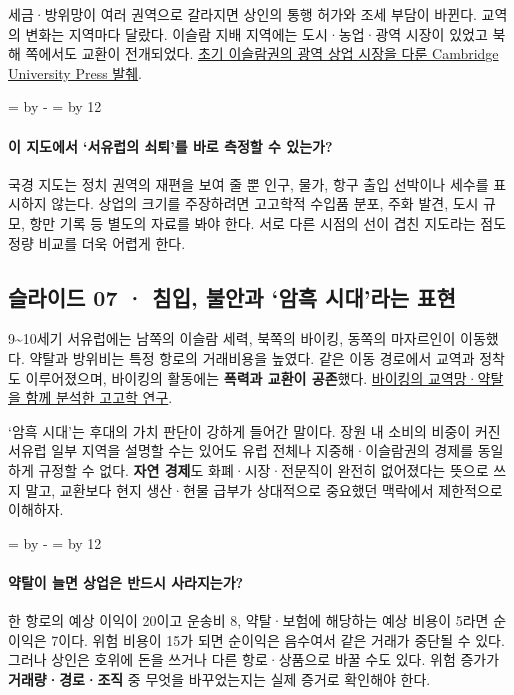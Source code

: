 \documentclass[10pt,a4paper]{article}
\newcommand{\ReserveQuestionSpace}{%
  \par\begingroup
  \dimen0=\pagegoal \advance\dimen0 by -\pagetotal
  \dimen2=\baselineskip \multiply\dimen2 by 12
  \ifdim\dimen0<\dimen2 \newpage\fi
  \endgroup}
\begin{document}
세금·방위망이 여러 권역으로 갈라지면 상인의 통행 허가와 조세 부담이 바뀐다. 교역의 변화는 지역마다 달랐다. 이슬람 지배 지역에는 도시·농업·광역 시장이 있었고 북해 쪽에서도 교환이 전개되었다. \href{https://assets.cambridge.org/97811071/56388/excerpt/9781107156388\_excerpt.pdf}{초기 이슬람권의 광역 상업 시장을 다룬 Cambridge University Press 발췌}.\par

\ReserveQuestionSpace
\paragraph{이 지도에서 ‘서유럽의 쇠퇴’를 바로 측정할 수 있는가?}
국경 지도는 정치 권역의 재편을 보여 줄 뿐 인구, 물가, 항구 출입 선박이나 세수를 표시하지 않는다. 상업의 크기를 주장하려면 고고학적 수입품 분포, 주화 발견, 도시 규모, 항만 기록 등 별도의 자료를 봐야 한다. 서로 다른 시점의 선이 겹친 지도라는 점도 정량 비교를 더욱 어렵게 한다.\par

\subsection{슬라이드 07 · 침입, 불안과 ‘암흑 시대’라는 표현}
9\textasciitilde{}10세기 서유럽에는 남쪽의 이슬람 세력, 북쪽의 바이킹, 동쪽의 마자르인이 이동했다. 약탈과 방위비는 특정 항로의 거래비용을 높였다. 같은 이동 경로에서 교역과 정착도 이루어졌으며, 바이킹의 활동에는 \textbf{폭력과 교환이 공존}했다. \href{https://www.cambridge.org/core/journals/antiquity/article/rethinking-the-early-viking-age-in-the-west/3C70AE18BBD25278C8CDC8ADD4260083}{바이킹의 교역망·약탈을 함께 분석한 고고학 연구}.\par

‘암흑 시대’는 후대의 가치 판단이 강하게 들어간 말이다. 장원 내 소비의 비중이 커진 서유럽 일부 지역을 설명할 수는 있어도 유럽 전체나 지중해·이슬람권의 경제를 동일하게 규정할 수 없다. \textbf{자연 경제}도 화폐·시장·전문직이 완전히 없어졌다는 뜻으로 쓰지 말고, 교환보다 현지 생산·현물 급부가 상대적으로 중요했던 맥락에서 제한적으로 이해하자.\par

\ReserveQuestionSpace
\paragraph{약탈이 늘면 상업은 반드시 사라지는가?}
한 항로의 예상 이익이 20이고 운송비 8, 약탈·보험에 해당하는 예상 비용이 5라면 순이익은 7이다. 위험 비용이 15가 되면 순이익은 음수여서 같은 거래가 중단될 수 있다. 그러나 상인은 호위에 돈을 쓰거나 다른 항로·상품으로 바꿀 수도 있다. 위험 증가가 \textbf{거래량·경로·조직} 중 무엇을 바꾸었는지는 실제 증거로 확인해야 한다.\par
\end{document}

